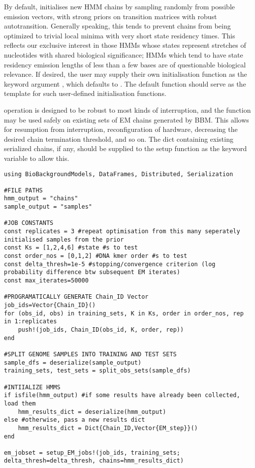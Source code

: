 By default,  initialises new HMM chains by sampling randomly from possible emission vectors, with strong priors on transition matrices with robust autotransition. Generally speaking, this tends to prevent chains from being optimized to trivial local minima with very short state residency times. This reflects our exclusive interest in those HMMs whose states represent stretches of nucleotides with shared biological significance; HMMs which tend to have state residency emission lengths of less than a few bases are of questionable biological relevance. If desired, the user may supply their own initialisation function as the  keyword argument , which defaults to . The default function should serve as the template for such user-defined initialisation functions.

 operation is designed to be robust to most kinds of interruption, and the  function may be used safely on existing sets of EM chains generated by BBM. This allows for resumption from interruption, reconfiguration of hardware, decreasing the desired chain termination threshold, and so on. The dict containing existing serialized chains, if any, should be supplied to the setup function as the  keyword variable to allow this.

\begin{verbatim}
using BioBackgroundModels, DataFrames, Distributed, Serialization

#FILE PATHS
hmm_output = "chains"
sample_output = "samples"

#JOB CONSTANTS
const replicates = 3 #repeat optimisation from this many seperately initialised samples from the prior
const Ks = [1,2,4,6] #state #s to test
const order_nos = [0,1,2] #DNA kmer order #s to test
const delta_thresh=1e-5 #stopping/convergence criterion (log probability difference btw subsequent EM iterates)
const max_iterates=50000

#PROGRAMATICALLY GENERATE Chain_ID Vector
job_ids=Vector{Chain_ID}()
for (obs_id, obs) in training_sets, K in Ks, order in order_nos, rep in 1:replicates
    push!(job_ids, Chain_ID(obs_id, K, order, rep))
end

#SPLIT GENOME SAMPLES INTO TRAINING AND TEST SETS
sample_dfs = deserialize(sample_output)
training_sets, test_sets = split_obs_sets(sample_dfs)

#INTIIALIZE HMMS
if isfile(hmm_output) #if some results have already been collected, load them
    hmm_results_dict = deserialize(hmm_output)
else #otherwise, pass a new results dict
    hmm_results_dict = Dict{Chain_ID,Vector{EM_step}}()
end

em_jobset = setup_EM_jobs!(job_ids, training_sets; delta_thresh=delta_thresh, chains=hmm_results_dict)
\end{verbatim}

